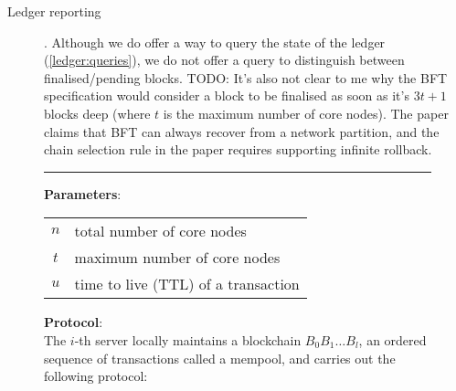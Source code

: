 \begin{description}
  \item[Ledger reporting].
  Although we do offer a way to query the state of the ledger
  (\cref{ledger:queries}), we do not offer a query to distinguish between
  finalised/pending blocks.
   TODO: It's also not clear to me why the BFT specification would
  consider a block to be finalised as soon as it's $3t + 1$ blocks deep
  (where $t$ is the maximum number of core nodes). The paper claims that BFT
  can always recover from a network partition, and the chain selection rule
  in the paper requires supporting infinite rollback.

\end{description}

\begin{figure}
\small
\hrule
\textbf{Parameters}:

\vspace{1em}

\begin{tabular}{c|l}
$n$ & total number of core nodes \\
$t$ & maximum number of core nodes \\
$u$ & time to live (TTL) of a transaction \\
\end{tabular}

\vspace{1em}

\textbf{Protocol}: \\

The $i$-th server locally maintains a blockchain $B_0 B_1 \ldots B_l$, an
ordered sequence of transactions called a mempool, and carries out the following
protocol:


\end{figure}
